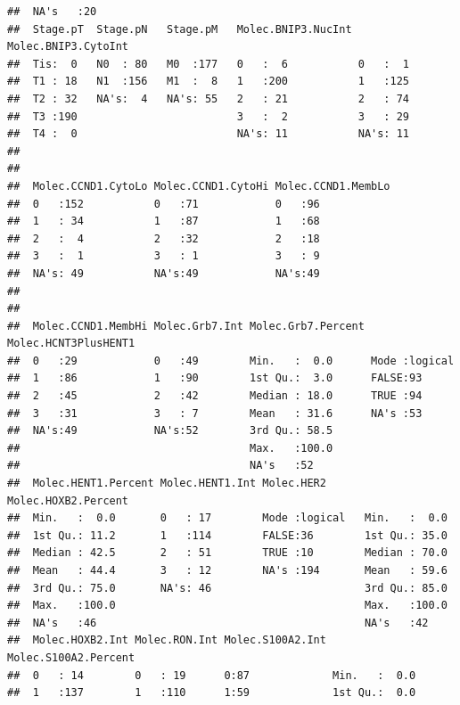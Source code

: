 \documentclass{article}\usepackage[]{graphicx}\usepackage[]{color}
\makeatletter
\newenvironment{kframe}{%
 \def\at@end@of@kframe{}%
 \ifinner\ifhmode%
  \def\at@end@of@kframe{\end{minipage}}%
  \begin{minipage}{\columnwidth}%
 \fi\fi%
 \def\FrameCommand##1{\hskip\@totalleftmargin \hskip-\fboxsep
 \colorbox{shadecolor}{##1}\hskip-\fboxsep
     \hskip-\linewidth \hskip-\@totalleftmargin \hskip\columnwidth}%
 \MakeFramed {\advance\hsize-\width
   \@totalleftmargin\z@ \linewidth\hsize
   \@setminipage}}%
 {\par\unskip\endMakeFramed%
 \at@end@of@kframe}
\newenvironment{knitrout}{}{} %
\makeatother
\begin{document}
\begin{knitrout}
\begin{kframe}
\begin{verbatim}
##  NA's   :20                                                       
##  Stage.pT  Stage.pN   Stage.pM   Molec.BNIP3.NucInt Molec.BNIP3.CytoInt
##  Tis:  0   N0  : 80   M0  :177   0   :  6           0   :  1           
##  T1 : 18   N1  :156   M1  :  8   1   :200           1   :125           
##  T2 : 32   NA's:  4   NA's: 55   2   : 21           2   : 74           
##  T3 :190                         3   :  2           3   : 29           
##  T4 :  0                         NA's: 11           NA's: 11           
##                                                                        
##                                                                        
##  Molec.CCND1.CytoLo Molec.CCND1.CytoHi Molec.CCND1.MembLo
##  0   :152           0   :71            0   :96           
##  1   : 34           1   :87            1   :68           
##  2   :  4           2   :32            2   :18           
##  3   :  1           3   : 1            3   : 9           
##  NA's: 49           NA's:49            NA's:49           
##                                                          
##                                                          
##  Molec.CCND1.MembHi Molec.Grb7.Int Molec.Grb7.Percent Molec.HCNT3PlusHENT1
##  0   :29            0   :49        Min.   :  0.0      Mode :logical       
##  1   :86            1   :90        1st Qu.:  3.0      FALSE:93            
##  2   :45            2   :42        Median : 18.0      TRUE :94            
##  3   :31            3   : 7        Mean   : 31.6      NA's :53            
##  NA's:49            NA's:52        3rd Qu.: 58.5                          
##                                    Max.   :100.0                          
##                                    NA's   :52                             
##  Molec.HENT1.Percent Molec.HENT1.Int Molec.HER2      Molec.HOXB2.Percent
##  Min.   :  0.0       0   : 17        Mode :logical   Min.   :  0.0      
##  1st Qu.: 11.2       1   :114        FALSE:36        1st Qu.: 35.0      
##  Median : 42.5       2   : 51        TRUE :10        Median : 70.0      
##  Mean   : 44.4       3   : 12        NA's :194       Mean   : 59.6      
##  3rd Qu.: 75.0       NA's: 46                        3rd Qu.: 85.0      
##  Max.   :100.0                                       Max.   :100.0      
##  NA's   :46                                          NA's   :42         
##  Molec.HOXB2.Int Molec.RON.Int Molec.S100A2.Int Molec.S100A2.Percent
##  0   : 14        0   : 19      0:87             Min.   :  0.0       
##  1   :137        1   :110      1:59             1st Qu.:  0.0       

\end{verbatim}
\end{kframe}
\end{knitrout}
\end{document}
